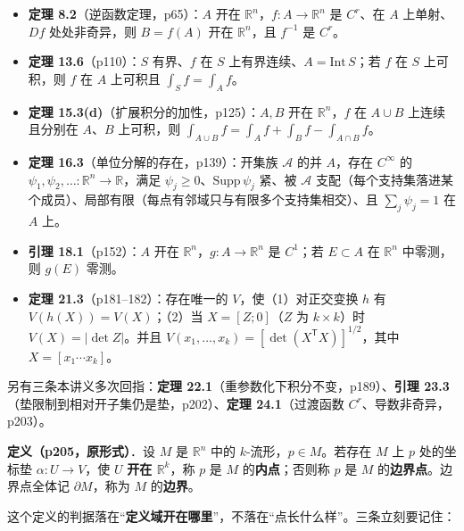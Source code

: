 \documentclass[11pt]{ctexart}
\newcommand{\Vvol}{V}
\begin{document}
\begin{itemize}
  \item \textbf{定理 8.2}（逆函数定理，p65）：$A$ 开在 $\mathbb{R}^n$，$f:A\to\mathbb{R}^n$ 是 $C^r$、在 $A$ 上单射、$Df$ 处处非奇异，则 $B=f(A)$ 开在 $\mathbb{R}^n$，且 $f^{-1}$ 是 $C^r$。
  \item \textbf{定理 13.6}（p110）：$S$ 有界、$f$ 在 $S$ 上有界连续、$A=\mathrm{Int}\,S$；若 $f$ 在 $S$ 上可积，则 $f$ 在 $A$ 上可积且 $\int_S f=\int_A f$。
  \item \textbf{定理 15.3(d)}（扩展积分的加性，p125）：$A,B$ 开在 $\mathbb{R}^n$，$f$ 在 $A\cup B$ 上连续且分别在 $A$、$B$ 上可积，则 $\int_{A\cup B}f=\int_Af+\int_Bf-\int_{A\cap B}f$。
  \item \textbf{定理 16.3}（单位分解的存在，p139）：开集族 $\mathcal{A}$ 的并 $A$，存在 $C^\infty$ 的 $\psi_1,\psi_2,\dots:\mathbb{R}^n\to\mathbb{R}$，满足 $\psi_j\ge0$、$\mathrm{Supp}\,\psi_j$ 紧、被 $\mathcal{A}$ 支配（每个支持集落进某个成员）、局部有限（每点有邻域只与有限多个支持集相交）、且 $\sum_j\psi_j=1$ 在 $A$ 上。
  \item \textbf{引理 18.1}（p152）：$A$ 开在 $\mathbb{R}^n$，$g:A\to\mathbb{R}^n$ 是 $C^1$；若 $E\subset A$ 在 $\mathbb{R}^n$ 中零测，则 $g(E)$ 零测。
  \item \textbf{定理 21.3}（p181--182）：存在唯一的 $\Vvol$，使（1）对正交变换 $h$ 有 $\Vvol(h(X))=\Vvol(X)$；（2）当 $X=[Z;0]$（$Z$ 为 $k\times k$）时 $\Vvol(X)=|\det Z|$。并且 $\Vvol(x_1,\dots,x_k)=[\det(X^{\mathsf T}X)]^{1/2}$，其中 $X=[x_1\cdots x_k]$。
\end{itemize}

另有三条本讲义多次回指：\textbf{定理 22.1}（重参数化下积分不变，p189）、\textbf{引理 23.3}（垫限制到相对开子集仍是垫，p202）、\textbf{定理 24.1}（过渡函数 $C^r$、导数非奇异，p203）。



\begin{notecall}
\textbf{定义（p205，原形式）}．设 $M$ 是 $\mathbb{R}^n$ 中的 $k$-流形，$p\in M$。若存在 $M$ 上 $p$ 处的坐标垫 $\alpha:U\to V$，使 $U$ \textbf{开在 $\mathbb{R}^k$}，称 $p$ 是 $M$ 的\textbf{内点}；否则称 $p$ 是 $M$ 的\textbf{边界点}。边界点全体记 $\partial M$，称为 $M$ 的\textbf{边界}。
\end{notecall}

这个定义的判据落在“\textbf{定义域开在哪里}”，不落在“点长什么样”。三条立刻要记住：
\end{document}

